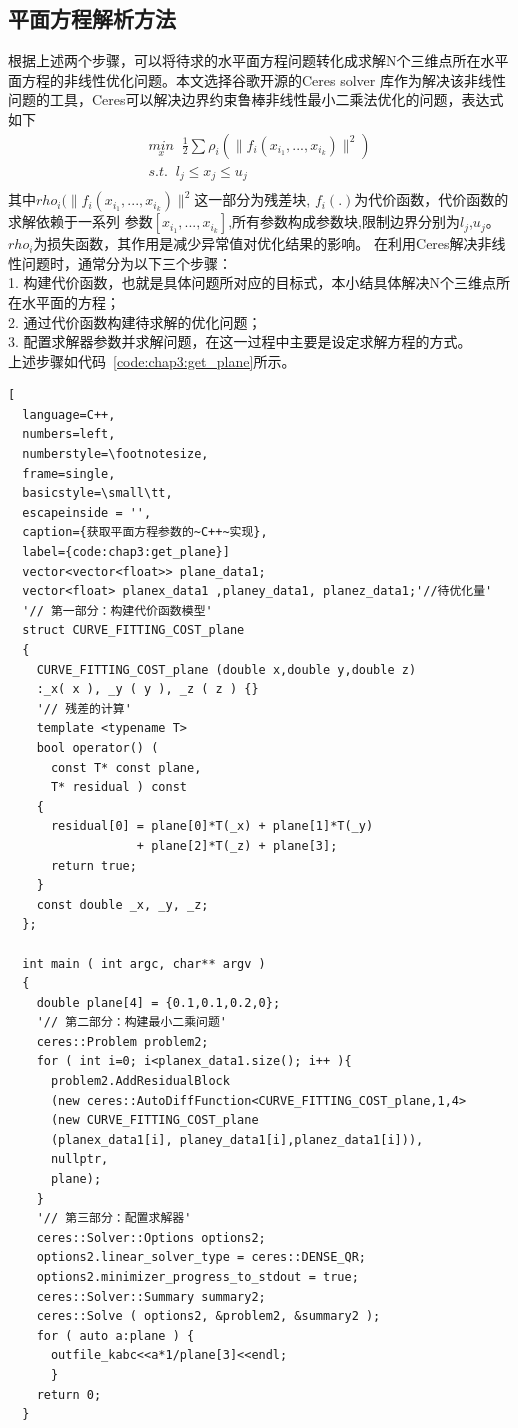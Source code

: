 \subsection{平面方程解析方法}
根据上述两个步骤，可以将待求的水平面方程问题转化成求解N个三维点所在水平面方程的非线性优化问题。本文选择谷歌开源的Ceres solver
库作为解决该非线性问题的工具，Ceres可以解决边界约束鲁棒非线性最小二乘法优化的问题，表达式如下
\begin{equation}
\begin{array}{l}\underset x{min}\;\;\frac12\sum\rho_i(\parallel f_i(x_{i_1},...,x_{i_k})\parallel^2)
\\s.t.\;\;l_j\leq x_j\leq u_j\\\end{array}
\end{equation}
其中$rho_i(\parallel f_i(x_{i_1},...,x_{i_k})\parallel^2$这一部分为残差块, $f_i(.)$为代价函数，代价函数的求解依赖于一系列
参数$[x_{i_1},...,x_{i_k}]$,所有参数构成参数块,限制边界分别为$l_j$,$u_j$。$rho_i$为损失函数，其作用是减少异常值对优化结果的影响。
在利用Ceres解决非线性问题时，通常分为以下三个步骤：\\
1.	构建代价函数，也就是具体问题所对应的目标式，本小结具体解决N个三维点所在水平面的方程；\\
2.	通过代价函数构建待求解的优化问题；\\
3.	配置求解器参数并求解问题，在这一过程中主要是设定求解方程的方式。\\
上述步骤如代码~\ref{code:chap3:get_plane}所示。
\begin{lstlisting}[
  language=C++,
  numbers=left,                
  numberstyle=\footnotesize,
  frame=single,     
  basicstyle=\small\tt,    
  escapeinside = '',
  caption={获取平面方程参数的~C++~实现},
  label={code:chap3:get_plane}]
  vector<vector<float>> plane_data1;
  vector<float> planex_data1 ,planey_data1, planez_data1;'//待优化量'
  '// 第一部分：构建代价函数模型'
  struct CURVE_FITTING_COST_plane
  {
    CURVE_FITTING_COST_plane (double x,double y,double z)
    :_x( x ), _y ( y ), _z ( z ) {}
    '// 残差的计算'
    template <typename T>
    bool operator() (
      const T* const plane,    
      T* residual ) const 
    {
      residual[0] = plane[0]*T(_x) + plane[1]*T(_y) 
                  + plane[2]*T(_z) + plane[3]; 
      return true;
    }
    const double _x, _y, _z;
  };

  int main ( int argc, char** argv )
  {   
    double plane[4] = {0.1,0.1,0.2,0};
    '// 第二部分：构建最小二乘问题'
    ceres::Problem problem2;
    for ( int i=0; i<planex_data1.size(); i++ ){
      problem2.AddResidualBlock 
      (new ceres::AutoDiffFunction<CURVE_FITTING_COST_plane,1,4> 
      (new CURVE_FITTING_COST_plane 
      (planex_data1[i], planey_data1[i],planez_data1[i])),
      nullptr,
      plane);
    }
    '// 第三部分：配置求解器'
    ceres::Solver::Options options2;    
    options2.linear_solver_type = ceres::DENSE_QR;
    options2.minimizer_progress_to_stdout = true; 
    ceres::Solver::Summary summary2;                 
    ceres::Solve ( options2, &problem2, &summary2 );
    for ( auto a:plane ) {
      outfile_kabc<<a*1/plane[3]<<endl;
      }
    return 0;
  }
\end{lstlisting}

